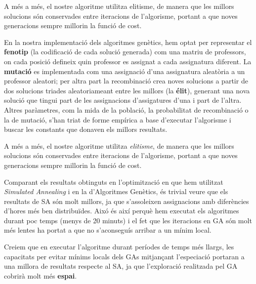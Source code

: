 \documentclass[10pt,twocolumn]{article}
\begin{document}
A més a més, el nostre algoritme utilitza elitisme, de manera que les millors solucions són conservades entre iteracions de l'algorisme, portant a que noves generacions sempre millorin la funció de cost.

En la nostra implementació dels algoritmes genètics, hem optat per representar el \textbf{fenotip} (la codificació de cada solució generada) com una matriu de professors, on cada posició defineix quin professor es assignat a cada assignatura diferent. La \textbf{mutació} es implementada com una assignació d'una assignatura aleatòria a un professor aleatori; per altra part la recombinació crea noves solucions a partir de dos solucions triades aleatoriameant entre les millors (la \textbf{élit}), generant una nova solució que tingui part de les assignacions d'assigatures d'una i part de l'altra. Altres paràmetres, com la mida de la població, la probabilitat de recombinació o la de mutació, s'han triat de forme empírica a base d'executar l'algorisme i buscar les constants que donaven els millors resultats.

A més a més, el nostre algoritme utilitza \textit{elitisme}, de manera que les millors solucions són conservades entre iteracions de l'algorisme, portant a que noves generacions sempre millorin la funció de cost.

Comparant els resultats obtinguts en l'optimització en que hem utilitzat \textit{Simulated Annealing} i en la d'Algoritmes Genètics, és trivial veure que els resultats de SA són molt millors, ja que s'assoleixen assignacions amb diferències d'hores més ben distribuïdes. Aixó és així perquè hem executat els algoritmes durant poc temps (menys de 20 minuts) i el fet que les iteracions en GA són molt més lentes ha portat a que no s'aconseguís arribar a un mínim local.

Creiem que en executar l'algoritme durant períodes de temps més llargs, les capacitats per evitar mínims locals dels GAs mitjançant l'especiació portaran a una millora de resultats respecte al SA, ja que l'exploració realitzada pel GA cobrirà molt més \textbf{espai}.
\end{document}
